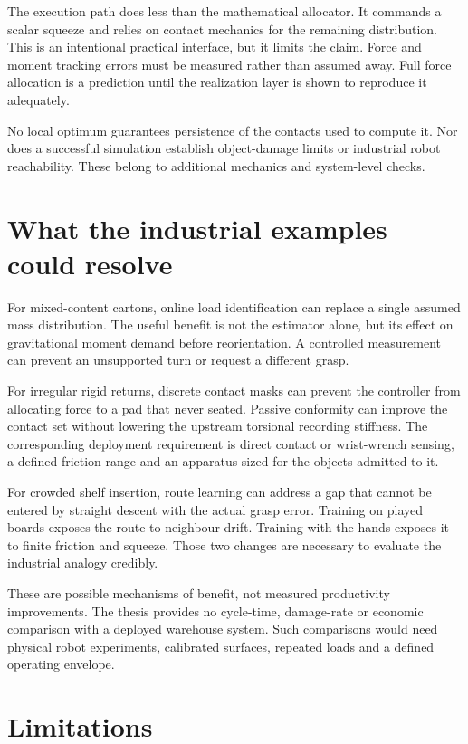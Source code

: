The execution path does less than the mathematical allocator. It commands a scalar squeeze and relies on contact mechanics for the remaining distribution. This is an intentional practical interface, but it limits the claim. Force and moment tracking errors must be measured rather than assumed away. Full force allocation is a prediction until the realization layer is shown to reproduce it adequately.

No local optimum guarantees persistence of the contacts used to compute it. Nor does a successful simulation establish object-damage limits or industrial robot reachability. These belong to additional mechanics and system-level checks.

\section{What the industrial examples could resolve}

For mixed-content cartons, online load identification can replace a single assumed mass distribution. The useful benefit is not the estimator alone, but its effect on gravitational moment demand before reorientation. A controlled measurement can prevent an unsupported turn or request a different grasp.

For irregular rigid returns, discrete contact masks can prevent the controller from allocating force to a pad that never seated. Passive conformity can improve the contact set without lowering the upstream torsional recording stiffness. The corresponding deployment requirement is direct contact or wrist-wrench sensing, a defined friction range and an apparatus sized for the objects admitted to it.

For crowded shelf insertion, route learning can address a gap that cannot be entered by straight descent with the actual grasp error. Training on played boards exposes the route to neighbour drift. Training with the hands exposes it to finite friction and squeeze. Those two changes are necessary to evaluate the industrial analogy credibly.

These are possible mechanisms of benefit, not measured productivity improvements. The thesis provides no cycle-time, damage-rate or economic comparison with a deployed warehouse system. Such comparisons would need physical robot experiments, calibrated surfaces, repeated loads and a defined operating envelope.

\section{Limitations}

